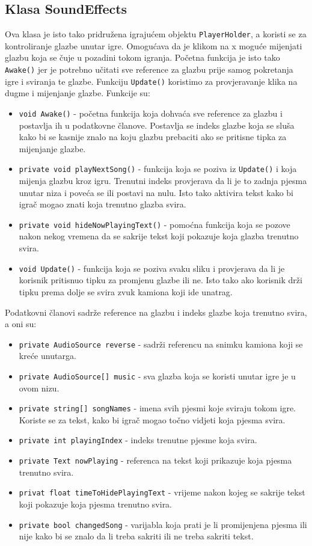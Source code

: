 \subsection{Klasa SoundEffects}
Ova klasa je isto tako pridružena igrajućem objektu \texttt{PlayerHolder}, a koristi se za kontroliranje glazbe unutar igre. Omogućava da je klikom na x moguće mijenjati glazbu koja se čuje u pozadini tokom igranja. Početna funkcija je isto tako \texttt{Awake()} jer je potrebno učitati sve reference za glazbu prije samog pokretanja igre i sviranja te glazbe. Funkciju \texttt{Update()} koristimo za provjeravanje klika na dugme i mijenjanje glazbe. Funkcije su:
\begin{itemize}
	\item \texttt{void Awake()} - početna funkcija koja dohvaća sve reference za glazbu i postavlja ih u podatkovne članove. Postavlja se indeks glazbe koja se sluša kako bi se kasnije znalo na koju glazbu prebaciti ako se pritisne tipka za mijenjanje glazbe.
	\item \texttt{private void playNextSong()} - funkcija koja se poziva iz \newline \texttt{Update()} i koja mijenja glazbu kroz igru. Trenutni indeks provjerava da li je to zadnja pjesma unutar niza i poveća se ili postavi na nulu. Isto tako aktivira tekst kako bi igrač mogao znati koja trenutno glazba svira.
	\item \texttt{private void hideNowPlayingText()} - pomoćna funkcija koja se pozove nakon nekog vremena da se sakrije tekst koji pokazuje koja glazba trenutno svira.
	\item \texttt{void Update()} - funkcija koja se poziva svaku sliku i provjerava da li je korisnik pritisnuo tipku za promjenu glazbe ili ne. Isto tako ako korisnik drži tipku prema dolje se svira zvuk kamiona koji ide unatrag.
\end{itemize}
Podatkovni članovi sadrže reference na glazbu i indeks glazbe koja trenutno svira, a oni su:
\begin{itemize}
	\item \texttt{private AudioSource reverse} - sadrži referencu na snimku kamiona koji se kreće unutarga.
	\item \texttt{private AudioSource[] music} - sva glazba koja se koristi unutar igre je u ovom nizu.
	\item \texttt{private string[] songNames} - imena svih pjesmi koje sviraju tokom igre. Koriste se za tekst, kako bi igrač mogao točno vidjeti koja pjesma svira.
	\item \texttt{private int playingIndex} - indeks trenutne pjesme koja svira.
	\item \texttt{private Text nowPlaying} - referenca na tekst koji prikazuje koja pjesma trenutno svira.
	\item \texttt{privat float timeToHidePlayingText} - vrijeme nakon kojeg se sakrije tekst koji pokazuje koja pjesma trenutno svira.
	\item \texttt{private bool changedSong} - varijabla koja prati je li promijenjena pjesma ili nije kako bi se znalo da li treba sakriti ili ne treba sakriti tekst.
\end{itemize}
